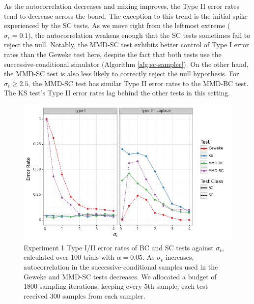 \documentclass[a4paper,11pt]{article}
\begin{document}
As the autocorrelation decreases and mixing improves, the Type II error rates tend to decrease across the board. The exception to this trend is the initial spike experienced by the SC tests. As we move right from the leftmost extreme ($\sigma_{\epsilon} = 0.1$), the autocorrelation weakens enough that the SC tests sometimes fail to reject the null. Notably, the MMD-SC test exhibits better control of Type I error rates than the Geweke test here, despite the fact that both tests use the successive-conditional simulator (Algorithm \ref{alg:sc-sampler}). On the other hand, the MMD-SC test is also less likely to correctly reject the null hypothesis. For $\sigma_{\epsilon} \geq 2.5$, the MMD-SC test has similar Type II error rates to the MMD-BC test. The KS test's Type II error rates lag behind the other tests in this setting.

\begin{figure}[H]
    \centering
    \includegraphics[width=\textwidth]{figures/gandy_scott_auto.png}
    \caption{Experiment 1 Type I/II error rates of BC and SC tests against $\sigma_{\epsilon}$, calculated over 100 trials with $\alpha=0.05$. As $\sigma_{\epsilon}$ increases, autocorrelation in the successive-conditional samples used in the Geweke and MMD-SC tests decreases. We allocated a budget of 1800 sampling iterations, keeping every 5th sample; each test received 300 samples from each sampler.}
    \label{fig:ex1_auto}
\end{figure}
\end{document}
